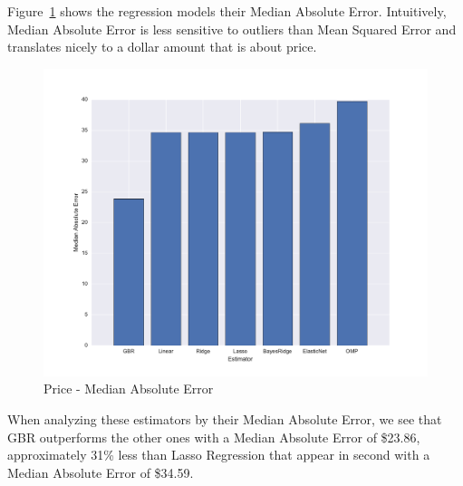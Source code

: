 \documentclass[sigconf]{acmart}
\begin{document}
Figure~\ref{fig:medianabsoluteerrorprice} shows the regression models their Median Absolute Error. Intuitively, Median Absolute Error is less sensitive to outliers than Mean Squared Error and translates nicely to a dollar amount that is about price.

\begin{figure}[!htpb]
	\centering
	\includegraphics[width=\linewidth]{images/median_absolute_error_price}
	\caption{Price - Median Absolute Error}
	\label{fig:medianabsoluteerrorprice}
\end{figure}

When analyzing these estimators by their Median Absolute Error, we see that GBR outperforms the other ones with a Median Absolute Error of \$23.86, approximately 31\% less than Lasso Regression that appear in second with a Median Absolute Error of \$34.59. 



\end{document}
